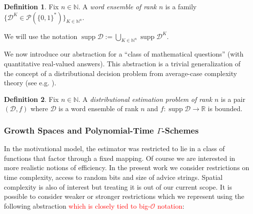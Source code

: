 \documentclass[11pt]{article}
\numberwithin{equation}{section}
\theoremstyle{definition}
\newtheorem{definition}{Definition}[section]
\theoremstyle{plain}
\newcommand{\Bool}{\{0,1\}}
\newcommand{\Words}{{\Bool^*}}
\DeclareMathOperator{\Supp}{supp}
\newcommand{\Nats}{\mathbb{N}}
\newcommand{\Reals}{\mathbb{R}}
\newcommand{\Dist}{\mathcal{D}}
\begin{document}
\begin{definition}

Fix ${n \in \Nats}$. A \emph{word ensemble of rank ${n}$} is a family ${\{\Dist^{K} \in \mathcal{P}(\Words)\}_{K \in \Nats^n}}$.

We will use the notation $\Supp \Dist := \bigcup_{K \in \Nats^n} \Supp \Dist^K$.

\end{definition}

We now introduce our abstraction for a \enquote{class of mathematical questions} (with quantitative real-valued answers). This abstraction is a trivial generalization of the concept of a distributional decision problem from average-case complexity theory (see e.g. \cite{Bogdanov_2006}).

\begin{definition}

Fix ${n \in \Nats}$. A \emph{distributional estimation problem of rank ${n}$} is a pair $(\Dist,f)$ where $\Dist$ is a word ensemble of rank ${n}$ and $f: \Supp \Dist \rightarrow \Reals$ is bounded.

\end{definition}

\subsubsection{Growth Spaces and Polynomial-Time \texorpdfstring{$\Gamma$}{Γ}-Schemes}

In the motivational model, the estimator was restricted to lie in a class of functions that factor through a fixed mapping. Of course we are interested in more realistic notions of efficiency. In the present work we consider restrictions on time complexity, access to random bits and size of advice strings. Spatial complexity is also of interest but treating it is out of our current scope. It is possible to consider weaker or stronger restrictions which we represent using the following abstraction \textcolor{red}{which is closely tied to big-$\mathcal{O}$ notation}:
\end{document}
